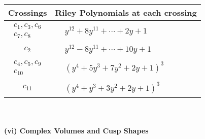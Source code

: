 \documentclass[1p]{elsarticle_modified}
\theoremstyle{definition}
\begin{document}
\begin{tabular}{m{50pt}|m{274pt}}
Crossings & \hspace{64pt}Riley Polynomials at each crossing \\
\hline $$\begin{aligned}c_{1},c_{3},c_{6}\\c_{7},c_{8}\end{aligned}$$&$\begin{aligned}
&y^{12}+8 y^{11}+\cdots+2 y+1
\end{aligned}$\\
\hline $$\begin{aligned}c_{2}\end{aligned}$$&$\begin{aligned}
&y^{12}-8 y^{11}+\cdots+10 y+1
\end{aligned}$\\
\hline $$\begin{aligned}c_{4},c_{5},c_{9}\\c_{10}\end{aligned}$$&$\begin{aligned}
&(y^4+5 y^3+7 y^2+2 y+1)^3
\end{aligned}$\\
\hline $$\begin{aligned}c_{11}\end{aligned}$$&$\begin{aligned}
&(y^4+y^3+3 y^2+2 y+1)^3
\end{aligned}$\\
\hline
\end{tabular}\\~\\
\newpage\flushleft \textbf{(vi) Complex Volumes and Cusp Shapes}
\end{document}
